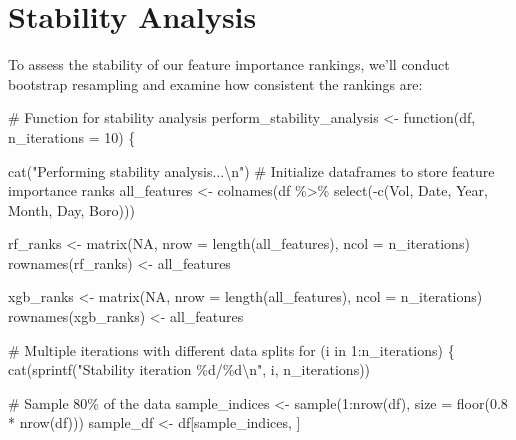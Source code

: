 \documentclass[
  letterpaper,
  DIV=11,
  numbers=noendperiod]{scrreprt}
\newenvironment{Shaded}{\begin{snugshade}}{\end{snugshade}}
\newcommand{\AttributeTok}[1]{\textcolor[rgb]{0.40,0.45,0.13}{#1}}
\newcommand{\CommentTok}[1]{\textcolor[rgb]{0.37,0.37,0.37}{#1}}
\newcommand{\ConstantTok}[1]{\textcolor[rgb]{0.56,0.35,0.01}{#1}}
\newcommand{\ControlFlowTok}[1]{\textcolor[rgb]{0.00,0.23,0.31}{#1}}
\newcommand{\DecValTok}[1]{\textcolor[rgb]{0.68,0.00,0.00}{#1}}
\newcommand{\FloatTok}[1]{\textcolor[rgb]{0.68,0.00,0.00}{#1}}
\newcommand{\FunctionTok}[1]{\textcolor[rgb]{0.28,0.35,0.67}{#1}}
\newcommand{\NormalTok}[1]{\textcolor[rgb]{0.00,0.23,0.31}{#1}}
\newcommand{\OtherTok}[1]{\textcolor[rgb]{0.00,0.23,0.31}{#1}}
\newcommand{\SpecialCharTok}[1]{\textcolor[rgb]{0.37,0.37,0.37}{#1}}
\newcommand{\StringTok}[1]{\textcolor[rgb]{0.13,0.47,0.30}{#1}}
\begin{document}
\section{Stability Analysis}\label{stability-analysis}

To assess the stability of our feature importance rankings, we'll
conduct bootstrap resampling and examine how consistent the rankings
are:

\begin{Shaded}
\begin{Highlighting}[]
\CommentTok{\# Function for stability analysis}
\NormalTok{perform\_stability\_analysis }\OtherTok{\textless{}{-}} \ControlFlowTok{function}\NormalTok{(df, }\AttributeTok{n\_iterations =} \DecValTok{10}\NormalTok{) \{}
  
  \FunctionTok{cat}\NormalTok{(}\StringTok{"Performing stability analysis...}\SpecialCharTok{\textbackslash{}n}\StringTok{"}\NormalTok{)}
  \CommentTok{\# Initialize dataframes to store feature importance ranks}
\NormalTok{  all\_features }\OtherTok{\textless{}{-}} \FunctionTok{colnames}\NormalTok{(df }\SpecialCharTok{\%\textgreater{}\%} \FunctionTok{select}\NormalTok{(}\SpecialCharTok{{-}}\FunctionTok{c}\NormalTok{(Vol, Date, Year, Month, Day, Boro)))}
  
\NormalTok{  rf\_ranks }\OtherTok{\textless{}{-}} \FunctionTok{matrix}\NormalTok{(}\ConstantTok{NA}\NormalTok{, }\AttributeTok{nrow =} \FunctionTok{length}\NormalTok{(all\_features), }\AttributeTok{ncol =}\NormalTok{ n\_iterations)}
  \FunctionTok{rownames}\NormalTok{(rf\_ranks) }\OtherTok{\textless{}{-}}\NormalTok{ all\_features}
  
\NormalTok{  xgb\_ranks }\OtherTok{\textless{}{-}} \FunctionTok{matrix}\NormalTok{(}\ConstantTok{NA}\NormalTok{, }\AttributeTok{nrow =} \FunctionTok{length}\NormalTok{(all\_features), }\AttributeTok{ncol =}\NormalTok{ n\_iterations)}
  \FunctionTok{rownames}\NormalTok{(xgb\_ranks) }\OtherTok{\textless{}{-}}\NormalTok{ all\_features}
  
  \CommentTok{\# Multiple iterations with different data splits}
  \ControlFlowTok{for}\NormalTok{ (i }\ControlFlowTok{in} \DecValTok{1}\SpecialCharTok{:}\NormalTok{n\_iterations) \{}
    \FunctionTok{cat}\NormalTok{(}\FunctionTok{sprintf}\NormalTok{(}\StringTok{"Stability iteration \%d/\%d}\SpecialCharTok{\textbackslash{}n}\StringTok{"}\NormalTok{, i, n\_iterations))}
    
    \CommentTok{\# Sample 80\% of the data}
\NormalTok{    sample\_indices }\OtherTok{\textless{}{-}} \FunctionTok{sample}\NormalTok{(}\DecValTok{1}\SpecialCharTok{:}\FunctionTok{nrow}\NormalTok{(df), }\AttributeTok{size =} \FunctionTok{floor}\NormalTok{(}\FloatTok{0.8} \SpecialCharTok{*} \FunctionTok{nrow}\NormalTok{(df)))}
\NormalTok{    sample\_df }\OtherTok{\textless{}{-}}\NormalTok{ df[sample\_indices, ]}
    

\end{Highlighting}
\end{Shaded}
\end{document}
